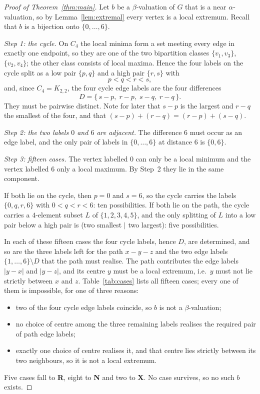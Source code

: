 \documentclass[11pt]{amsart}
\theoremstyle{remark}
\begin{document}
\begin{proof}[Proof of Theorem~\ref{thm:main}]
Let $b$ be a $\beta$-valuation of $G$ that is a near $\alpha$-valuation, so by
Lemma~\ref{lem:extremal} every vertex is a local extremum. Recall that $b$ is a
bijection onto $\{0,\ldots,6\}$.

\emph{Step 1: the cycle.} On $C_4$ the local minima form a set meeting every
edge in exactly one endpoint, so they are one of the two bipartition classes
$\{v_1,v_3\}$, $\{v_2,v_4\}$; the other class consists of local maxima. Hence
the four labels on the cycle split as a low pair $\{p,q\}$ and a high pair
$\{r,s\}$ with
\[
 p<q<r<s ,
\]
and, since $C_4=K_{2,2}$, the four cycle edge labels are the four differences
\[
 D=\{\,s-p,\; r-p,\; s-q,\; r-q\,\}.
\]
They must be pairwise distinct. Note for later that $s-p$ is the largest and
$r-q$ the smallest of the four, and that
$(s-p)+(r-q)=(r-p)+(s-q)$.

\emph{Step 2: the two labels $0$ and $6$ are adjacent.} The difference $6$ must
occur as an edge label, and the only pair of labels in $\{0,\ldots,6\}$ at
distance $6$ is $\{0,6\}$.

\emph{Step 3: fifteen cases.} The vertex labelled $0$ can only be a local
minimum and the vertex labelled $6$ only a local maximum. By Step~2 they lie in
the same component.

If both lie on the cycle, then $p=0$ and $s=6$, so the cycle carries the labels
$\{0,q,r,6\}$ with $0<q<r<6$: ten possibilities. If both lie on the path, the
cycle carries a $4$-element subset $L$ of $\{1,2,3,4,5\}$, and the only splitting
of $L$ into a low pair below a high pair is (two smallest $\mid$ two largest):
five possibilities.

In each of these fifteen cases the four cycle labels, hence $D$, are determined,
and so are the three labels left for the path $x-y-z$ and the two edge labels
$\{1,\ldots,6\}\setminus D$ that the path must realise. The path contributes the
edge labels $|y-x|$ and $|y-z|$, and its centre $y$ must be a local extremum,
i.e.\ $y$ must not lie strictly between $x$ and $z$. Table~\ref{tab:cases} lists
all fifteen cases; every one of them is impossible, for one of three reasons:

\begin{itemize}
\item[\textbf{R}] two of the four cycle edge labels coincide, so $b$ is not a
      $\beta$-valuation;
\item[\textbf{N}] no choice of centre among the three remaining labels realises
      the required pair of path edge labels;
\item[\textbf{X}] exactly one choice of centre realises it, and that centre lies
      strictly between its two neighbours, so it is not a local extremum.
\end{itemize}

Five cases fall to \textbf{R}, eight to \textbf{N} and two to \textbf{X}. No
case survives, so no such $b$ exists.
\end{proof}
\end{document}
